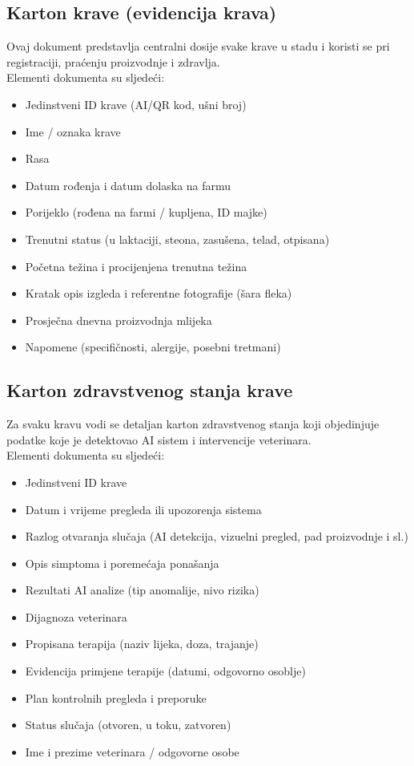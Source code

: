 \documentclass{article}
\begin{document}
\subsection*{Karton krave (evidencija krava)}
Ovaj dokument predstavlja centralni dosije svake krave u stadu i koristi se pri registraciji, praćenju proizvodnje i zdravlja. \\

\noindent Elementi dokumenta su sljedeći:
\begin{itemize}
    \item Jedinstveni ID krave (AI/QR kod, ušni broj)
    \item Ime / oznaka krave
    \item Rasa
    \item Datum rođenja i datum dolaska na farmu
    \item Porijeklo (rođena na farmi / kupljena, ID majke)
    \item Trenutni status (u laktaciji, steona, zasušena, telad, otpisana)
    \item Početna težina i procijenjena trenutna težina
    \item Kratak opis izgleda i referentne fotografije (šara fleka)
    \item Prosječna dnevna proizvodnja mlijeka
    \item Napomene (specifičnosti, alergije, posebni tretmani)
\end{itemize}

\subsection*{Karton zdravstvenog stanja krave}
Za svaku kravu vodi se detaljan karton zdravstvenog stanja koji objedinjuje podatke koje je detektovao AI sistem i intervencije veterinara. \\

\noindent Elementi dokumenta su sljedeći:
\begin{itemize}
    \item Jedinstveni ID krave
    \item Datum i vrijeme pregleda ili upozorenja sistema
    \item Razlog otvaranja slučaja (AI detekcija, vizuelni pregled, pad proizvodnje i sl.)
    \item Opis simptoma i poremećaja ponašanja
    \item Rezultati AI analize (tip anomalije, nivo rizika)
    \item Dijagnoza veterinara
    \item Propisana terapija (naziv lijeka, doza, trajanje)
    \item Evidencija primjene terapije (datumi, odgovorno osoblje)
    \item Plan kontrolnih pregleda i preporuke
    \item Status slučaja (otvoren, u toku, zatvoren)
    \item Ime i prezime veterinara / odgovorne osobe
\end{itemize}
\end{document}
